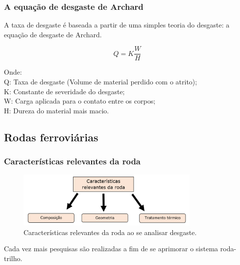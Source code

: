 \documentclass{beamer}
\begin{document}
\begin{frame}
\frametitle{A equação de desgaste de Archard}
A taxa de desgaste é baseada a partir de uma simples teoria do desgaste: a equação de desgaste de Archard.


\begin{equation} \label{eq:archard}
Q = K\frac{W}{H}
\end{equation}

Onde:\\
{\scriptsize Q: Taxa de desgaste (Volume de  material perdido com o atrito);\\
K: Constante de severidade do desgaste;\\
W: Carga aplicada para o contato entre os corpos;\\
H: Dureza do material mais macio.\\}


\end{frame}




\subsection{Rodas ferroviárias}

\begin{frame}

\frametitle{Características relevantes da roda}



\begin{figure}
	\centering
	\includegraphics[width=0.8\textwidth]{caracteristicas_roda}
	\caption{Características relevantes da roda ao se analisar desgaste.}
	\label{fig:caracteristicas_roda}
\end{figure}


Cada vez mais pesquisas são realizadas a fim de se aprimorar o sistema roda-trilho. 


\end{frame}
\end{document}
